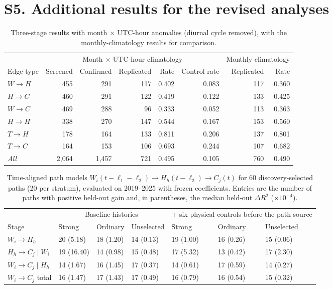 \documentclass[11pt]{article}
\begin{document}
\section*{S5. Additional results for the revised analyses}

\begin{table}[htbp]
\centering
\caption{Three-stage results with month $\times$ UTC-hour anomalies (diurnal cycle removed), with the monthly-climatology results for comparison.}
\label{tab:s11}
\scriptsize
\begin{tabular}{@{}lrrrrrrr@{}}
\toprule
& \multicolumn{5}{c}{Month $\times$ UTC-hour climatology} & \multicolumn{2}{c}{Monthly climatology} \\
\cmidrule(lr){2-6}\cmidrule(lr){7-8}
Edge type & Screened & Confirmed & Replicated & Rate & Control rate & Replicated & Rate \\
\midrule
$W\rightarrow H$ & 455 & 291 & 117 & 0.402 & 0.083 & 117 & 0.360 \\
$H\rightarrow C$ & 460 & 291 & 122 & 0.419 & 0.122 & 133 & 0.425 \\
$W\rightarrow C$ & 469 & 288 & 96 & 0.333 & 0.052 & 113 & 0.363 \\
$H\rightarrow H$ & 338 & 270 & 147 & 0.544 & 0.167 & 153 & 0.560 \\
$T\rightarrow H$ & 178 & 164 & 133 & 0.811 & 0.206 & 137 & 0.801 \\
$T\rightarrow C$ & 164 & 153 & 106 & 0.693 & 0.244 & 107 & 0.682 \\
\midrule
\textit{All} & 2,064 & 1,457 & 721 & 0.495 & 0.105 & 760 & 0.490 \\
\bottomrule
\end{tabular}
\end{table}

\begin{table}[htbp]
\centering
\caption{Time-aligned path models $W_i(t-\ell_1-\ell_2)\rightarrow H_h(t-\ell_2)\rightarrow C_j(t)$ for 60 discovery-selected paths (20 per stratum), evaluated on 2019--2025 with frozen coefficients. Entries are the number of paths with positive held-out gain and, in parentheses, the median held-out $\Delta R^2$ ($\times10^{-4}$).}
\label{tab:s12}
\scriptsize
\begin{tabular}{@{}lllllll@{}}
\toprule
& \multicolumn{3}{c}{Baseline histories} & \multicolumn{3}{c}{+ six physical controls before the path source} \\
\cmidrule(lr){2-4}\cmidrule(lr){5-7}
Stage & Strong & Ordinary & Unselected & Strong & Ordinary & Unselected \\
\midrule
$W_i\rightarrow H_h$ & 20 (5.18) & 18 (1.20) & 14 (0.13) & 19 (1.00) & 16 (0.26) & 15 (0.06) \\
$H_h\rightarrow C_j\mid W_i$ & 19 (16.40) & 14 (0.98) & 15 (0.48) & 17 (5.32) & 13 (0.42) & 17 (2.30) \\
$W_i\rightarrow C_j\mid H_h$ & 14 (1.67) & 16 (1.45) & 17 (0.37) & 14 (0.61) & 17 (0.59) & 14 (0.27) \\
$W_i\rightarrow C_j$ total & 16 (1.47) & 17 (1.43) & 17 (0.49) & 16 (0.79) & 16 (0.54) & 15 (0.32) \\
\bottomrule
\end{tabular}
\end{table}
\end{document}
